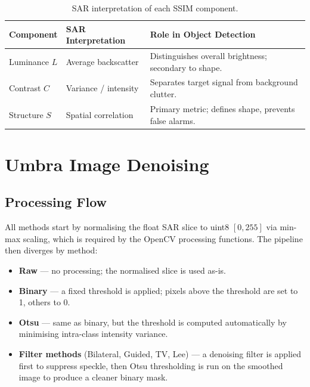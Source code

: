 \documentclass[12pt]{article}
\begin{document}
\begin{table}[H]
    \centering
    \caption{SAR interpretation of each SSIM component.}
    \begin{tabular}{lll}
        \toprule
        Component & SAR Interpretation & Role in Object Detection \\
        \midrule
        Luminance $L$ & Average backscatter &
            Distinguishes overall brightness; secondary to shape. \\
        Contrast $C$ & Variance / intensity &
            Separates target signal from background clutter. \\
        Structure $S$ & Spatial correlation &
            Primary metric; defines shape, prevents false alarms. \\
        \bottomrule
    \end{tabular}
\end{table}

\appendix

\section{Umbra Image Denoising}

\subsection{Processing Flow}

All methods start by normalising the float SAR slice to uint8 $[0, 255]$ via
min-max scaling, which is required by the OpenCV processing functions.
The pipeline then diverges by method:

\begin{itemize}
    \item \textbf{Raw} — no processing; the normalised slice is used as-is.
    \item \textbf{Binary} — a fixed threshold is applied; pixels above the
          threshold are set to 1, others to 0.
    \item \textbf{Otsu} — same as binary, but the threshold is computed
          automatically by minimising intra-class intensity variance.
    \item \textbf{Filter methods} (Bilateral, Guided, TV, Lee) — a denoising
          filter is applied first to suppress speckle, then Otsu thresholding
          is run on the smoothed image to produce a cleaner binary mask.
\end{itemize}
\end{document}
